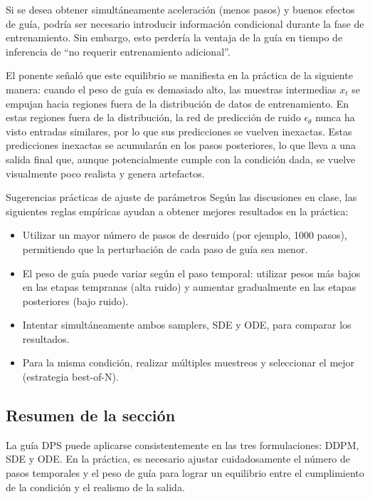 \documentclass[a4paper]{article}
\begin{document}
Si se desea obtener simultáneamente aceleración (menos pasos) y buenos efectos de guía, podría ser necesario introducir información condicional durante la fase de entrenamiento. Sin embargo, esto perdería la ventaja de la guía en tiempo de inferencia de ``no requerir entrenamiento adicional''.

El ponente señaló que este equilibrio se manifiesta en la práctica de la siguiente manera: cuando el peso de guía es demasiado alto, las muestras intermedias $x_t$ se empujan hacia regiones fuera de la distribución de datos de entrenamiento. En estas regiones fuera de la distribución, la red de predicción de ruido $\epsilon_\theta$ nunca ha visto entradas similares, por lo que sus predicciones se vuelven inexactas. Estas predicciones inexactas se acumularán en los pasos posteriores, lo que lleva a una salida final que, aunque potencialmente cumple con la condición dada, se vuelve visualmente poco realista y genera artefactos.

\begin{knowledgebox}{Sugerencias prácticas de ajuste de parámetros}
Según las discusiones en clase, las siguientes reglas empíricas ayudan a obtener mejores resultados en la práctica:
\begin{itemize}
    \item Utilizar un mayor número de pasos de desruido (por ejemplo, 1000 pasos), permitiendo que la perturbación de cada paso de guía sea menor.
    \item El peso de guía puede variar según el paso temporal: utilizar pesos más bajos en las etapas tempranas (alta ruido) y aumentar gradualmente en las etapas posteriores (bajo ruido).
    \item Intentar simultáneamente ambos samplers, SDE y ODE, para comparar los resultados.
    \item Para la misma condición, realizar múltiples muestreos y seleccionar el mejor (estrategia best-of-N).
\end{itemize}
\end{knowledgebox}

\subsection{Resumen de la sección}

La guía DPS puede aplicarse consistentemente en las tres formulaciones: DDPM, SDE y ODE. En la práctica, es necesario ajustar cuidadosamente el número de pasos temporales y el peso de guía para lograr un equilibrio entre el cumplimiento de la condición y el realismo de la salida.
\end{document}
